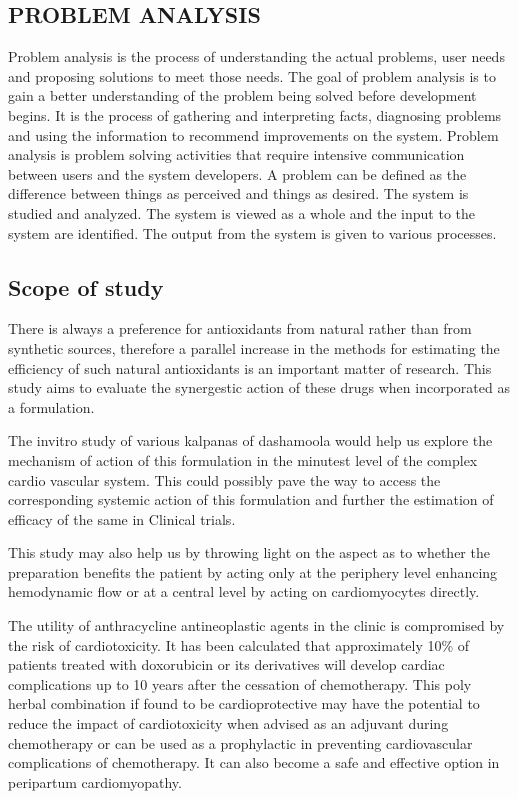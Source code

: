\documentclass[11pt]{article} %
\begin{document}
\subsection{PROBLEM ANALYSIS}
\label{subsec:PROBLEM ANALYSIS}

Problem analysis is the process of understanding the actual problems, user needs and proposing solutions to meet those needs. The goal of problem analysis is to gain a better understanding of the problem being solved before development begins. It is the process of gathering and interpreting facts, diagnosing problems and using the information to recommend improvements on the system. Problem analysis is problem solving activities that require intensive communication between users and the system developers. A problem can be defined as the difference between things as perceived and things as desired. The system is studied and analyzed. The system is viewed as a whole and the input to the system are identified. The output from the system is given to various processes.

\subsection{Scope of study}
\label{subsec:scope}

There is always a preference for antioxidants from natural rather than from synthetic
sources, therefore a parallel increase in the methods for estimating the efficiency of such natural antioxidants is an important matter of research. This study aims to evaluate the synergestic action of these drugs when incorporated as a formulation.

The invitro study of various kalpanas of dashamoola would help us explore the
mechanism of action of this formulation in the minutest level of the complex cardio vascular
system. This could possibly pave the way to access the corresponding systemic action of this
formulation and further the estimation of efficacy of the same in Clinical trials.

This study may also help us by throwing light on the aspect as to whether the preparation
benefits the patient by acting only at the periphery level enhancing hemodynamic flow or at a
central level by acting on cardiomyocytes directly.

The utility of anthracycline antineoplastic agents in the clinic is compromised by the risk
of cardiotoxicity. It has been calculated that approximately 10\% of patients treated with
doxorubicin or its derivatives will develop cardiac complications up to 10 years after the
cessation of chemotherapy. This poly herbal combination if found to be cardioprotective may
have the potential to reduce the impact of cardiotoxicity when advised as an adjuvant during
chemotherapy or can be used as a prophylactic in preventing cardiovascular complications of
chemotherapy. It can also become a safe and effective option in peripartum cardiomyopathy.
\end{document}
